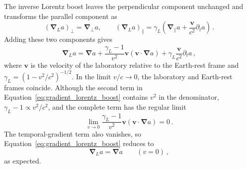 The inverse Lorentz boost leaves the perpendicular component unchanged and transforms the parallel component as
\begin{equation}
    \left(\boldsymbol{\nabla}_{L}a\right)_{\perp}
    =
    \boldsymbol{\nabla}_{\perp}a,
    \qquad
    \left(\boldsymbol{\nabla}_{L}a\right)_{\parallel}
    =
    \gamma_L
    \left(
    \boldsymbol{\nabla}_{\parallel}a
    +
    \frac{\mathbf{v}}{c^2}\partial_t a
    \right)
    \,.
\end{equation}
Adding these two components gives
\begin{equation}
    \boldsymbol{\nabla}_{L}a
    =
    \boldsymbol{\nabla}a
    +\frac{\gamma_L-1}{v^2}\mathbf{v}
    \left(\mathbf{v}\cdot\boldsymbol{\nabla}a\right)
    +\gamma_L\frac{\mathbf{v}}{c^2}\partial_t a
    \,,\label{eq:gradient_lorentz_boost}
\end{equation}
where $\mathbf{v}$ is the velocity of the laboratory relative to the Earth-rest frame and $\gamma_L=(1-v^2/c^2)^{-1/2}$.
In the limit $v/c\to0$, the laboratory and Earth-rest frames coincide.
Although the second term in Equation~\eqref{eq:gradient_lorentz_boost} contains $v^2$ in the denominator, $\gamma_L-1\propto v^2/c^2$, and the complete term has the regular limit
\begin{equation}
    \lim_{v\to0}
    \frac{\gamma_L-1}{v^2}\mathbf{v}
    \left(\mathbf{v}\cdot\boldsymbol{\nabla}a\right)
    =0
    \,.
\end{equation}
The temporal-gradient term also vanishes, so Equation~\eqref{eq:gradient_lorentz_boost} reduces to
\begin{equation}
    \boldsymbol{\nabla}_{L}a=\boldsymbol{\nabla}a
    \qquad (v=0)
    \,,
\end{equation}
as expected.

